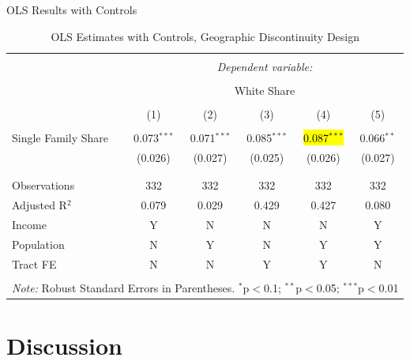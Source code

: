 \documentclass{beamer}
\makeatletter
\let\HL\hl
\renewcommand\hl{%
  \let\set@color\beamerorig@set@color
  \let\reset@color\beamerorig@reset@color
  \HL}
\makeatother
\begin{document}
\begin{frame}{OLS Results with Controls}
\footnotesize
\begin{table}[!htbp] \centering 
  \caption{OLS Estimates with Controls,  Geographic Discontinuity Design}
  \label{tab:OLS_controls_causal} 
\begin{tabular}{@{\extracolsep{5pt}}lccccc} 
\\[-1.8ex]\hline 
\hline \\[-1.8ex] 
 & \multicolumn{5}{c}{\textit{Dependent variable:}} \\ 
\cline{2-6} 
\\[-1.8ex] & \multicolumn{5}{c}{White Share} \\ 
\\[-1.8ex] & (1) & (2) & (3) & (4) & (5)\\ 
\hline \\[-1.8ex] 
 Single Family Share & 0.073$^{***}$ & 0.071$^{***}$ & 0.085$^{***}$ & \hl{0.087$^{***}$} & 0.066$^{**}$ \\ 
  & (0.026) & (0.027) & (0.025) & (0.026) & (0.027) \\ 
  & & & & & \\ 
\hline \\[-1.8ex] 
Observations & 332 & 332 & 332 & 332 & 332 \\ 
Adjusted R$^{2}$ & 0.079 & 0.029 & 0.429 & 0.427 & 0.080 \\ 
\hline
Income & Y & N & N & N & Y\\
Population & N & Y & N & Y & Y\\
Tract FE & N & N & Y & Y & N\\
\hline 
\hline \\[-1.8ex] 
\multicolumn{6}{l}{\textit{Note:} Robust Standard Errors in Parentheses. $^{*}$p$<$0.1; $^{**}$p$<$0.05; $^{***}$p$<$0.01} \\ 
\end{tabular} 
\end{table}
\end{frame}

\section{Discussion}
\end{document}
